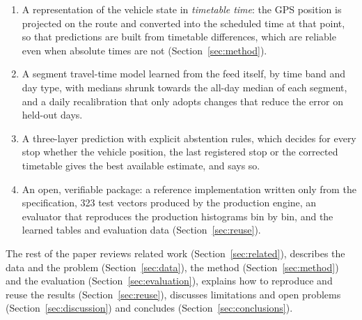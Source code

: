 \documentclass[preprint,11pt,nonatbib]{elsarticle}
\begin{document}
\begin{enumerate}
  \item A representation of the vehicle state in \emph{timetable time}: the GPS position is projected on the route
        and converted into the scheduled time at that point, so that predictions are built from timetable
        differences, which are reliable even when absolute times are not (Section~\ref{sec:method}).
  \item A segment travel-time model learned from the feed itself, by time band and day type, with medians shrunk
        towards the all-day median of each segment, and a daily recalibration that only adopts changes that reduce
        the error on held-out days.
  \item A three-layer prediction with explicit abstention rules, which decides for every stop whether the vehicle
        position, the last registered stop or the corrected timetable gives the best available estimate, and says so.
  \item An open, verifiable package: a reference implementation written only from the specification, 323 test
        vectors produced by the production engine, an evaluator that reproduces the production histograms bin by
        bin, and the learned tables and evaluation data (Section~\ref{sec:reuse}).
\end{enumerate}

\noindent The rest of the paper reviews related work (Section~\ref{sec:related}), describes the data and the problem
(Section~\ref{sec:data}), the method (Section~\ref{sec:method}) and the evaluation (Section~\ref{sec:evaluation}),
explains how to reproduce and reuse the results (Section~\ref{sec:reuse}), discusses limitations and open problems
(Section~\ref{sec:discussion}) and concludes (Section~\ref{sec:conclusions}).

\begin{figure}[t]
\centering
{}
\end{figure}
\end{document}

